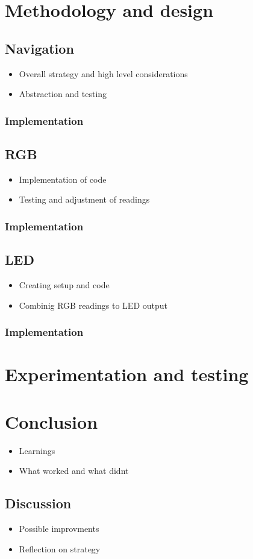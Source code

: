 \documentclass{article}
\begin{document}
    \section*{Methodology and design}
        \subsection*{Navigation}
            \begin{itemize}
                \item Overall strategy and high level considerations
                \item Abstraction and testing
            \end{itemize}
                \subsubsection*{Implementation}
        \subsection*{RGB}
            \begin{itemize}
                \item Implementation of code
                \item Testing and adjustment of readings
            \end{itemize}
                \subsubsection*{Implementation}
        \subsection*{LED}
            \begin{itemize}
                \item Creating setup and code
                \item Combinig RGB readings to LED output
            \end{itemize}
                \subsubsection*{Implementation}
    \section*{Experimentation and testing}
    \section*{Conclusion}
    \begin{itemize}
        \item Learnings
        \item What worked and what didnt
    \end{itemize}
        \subsection*{Discussion}
            \begin{itemize}
                \item Possible improvments
                \item Reflection on strategy
            \end{itemize}
\end{document}
